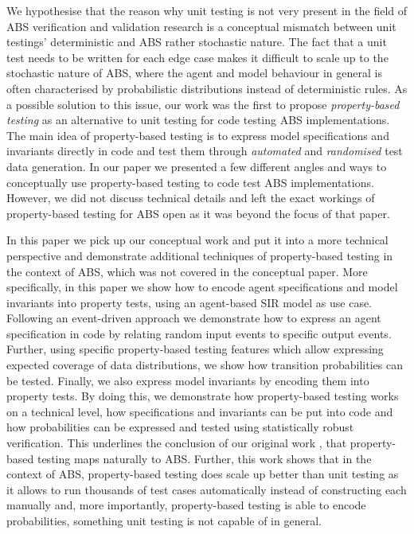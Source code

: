 We hypothesise that the reason why unit testing is not very present in the field of ABS verification and validation research is a conceptual mismatch between unit testings' deterministic and ABS rather stochastic nature. The fact that a unit test needs to be written for each edge case makes it difficult to scale up to the stochastic nature of ABS, where the agent and model behaviour in general is often characterised by probabilistic distributions instead of deterministic rules. As a possible solution to this issue, our work \cite{thaler_show_2019} was the first to propose \textit{property-based testing} as an alternative to unit testing for code testing ABS implementations. The main idea of property-based testing is to express model specifications and invariants directly in code and test them through \textit{automated} and \textit{randomised} test data generation. In our paper \cite{thaler_show_2019} we presented a few different angles and ways to conceptually use property-based testing to code test ABS implementations. However, we did not discuss technical details and left the exact workings of property-based testing for ABS open as it was beyond the focus of that paper.

In this paper we pick up our conceptual work \cite{thaler_show_2019} and put it into a more technical perspective and demonstrate additional techniques of property-based testing in the context of ABS, which was not covered in the conceptual paper. More specifically, in this paper we show how to encode agent specifications and model invariants into property tests, using an agent-based SIR model \cite{macal_agent-based_2010} as use case. Following an event-driven \cite{meyer_event-driven_2014} approach we demonstrate how to express an agent specification in code by relating random input events to specific output events. Further, using specific property-based testing features which allow expressing expected coverage of data distributions, we show how transition probabilities can be tested. Finally, we also express model invariants by encoding them into property tests. By doing this, we demonstrate how property-based testing works on a technical level, how specifications and invariants can be put into code and how probabilities can be expressed and tested using statistically robust verification. This underlines the conclusion of our original work \cite{thaler_show_2019}, that property-based testing maps naturally to ABS. Further, this work shows that in the context of ABS, property-based testing does scale up better than unit testing as it allows to run thousands of test cases automatically instead of constructing each manually and, more importantly, property-based testing is able to encode probabilities, something unit testing is not capable of in general.

